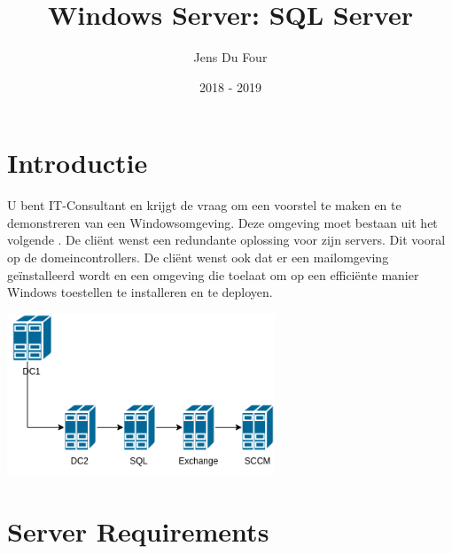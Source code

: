 \documentclass[a4paper]{article}
\title{Windows Server: SQL Server}
\author{Jens Du Four}
\date{2018 - 2019}
\begin{document}
\maketitle

\section{Introductie}
U bent IT-Consultant en krijgt de vraag om een voorstel te maken en te demonstreren van een Windowsomgeving. Deze omgeving moet bestaan uit het volgende . De cliënt wenst een redundante oplossing voor zijn servers. Dit vooral op de domeincontrollers. De cliënt wenst ook dat er een mailomgeving geïnstalleerd wordt en een omgeving die toelaat om op een efficiënte manier Windows toestellen te installeren en te deployen.

\begin{center}
\includegraphics[width=8cm]{Netwerkdiagram.png}
\end{center}

\section{Server Requirements}
\end{document}

